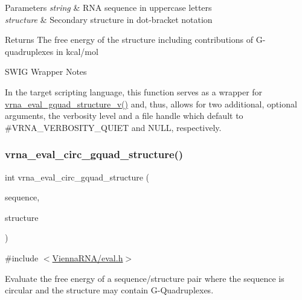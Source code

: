 \begin{DoxyParams}{Parameters}
{\em string} & R\+NA sequence in uppercase letters \\
\hline
{\em structure} & Secondary structure in dot-\/bracket notation \\
\hline
\end{DoxyParams}
\begin{DoxyReturn}{Returns}
The free energy of the structure including contributions of G-\/quadruplexes in kcal/mol
\end{DoxyReturn}
\begin{DoxyRefDesc}{S\+W\+I\+G Wrapper Notes}
\item[\hyperlink{wrappers__wrappers000037}{S\+W\+I\+G Wrapper Notes}]In the target scripting language, this function serves as a wrapper for \hyperlink{group__eval_gaeaa2bdbc1b5d78c667e735fbdff87fff}{vrna\+\_\+eval\+\_\+gquad\+\_\+structure\+\_\+v()} and, thus, allows for two additional, optional arguments, the verbosity level and a file handle which default to \#\+V\+R\+N\+A\+\_\+\+V\+E\+R\+B\+O\+S\+I\+T\+Y\+\_\+\+Q\+U\+I\+ET and N\+U\+LL, respectively. \end{DoxyRefDesc}
\mbox{\label{group__eval_ga9dba2fc5d7e6ad1359a7c2f350589c0e}} 
\subsubsection{\texorpdfstring{vrna\+\_\+eval\+\_\+circ\+\_\+gquad\+\_\+structure()}{vrna\_eval\_circ\_gquad\_structure()}}
{\footnotesize\ttfamily int vrna\+\_\+eval\+\_\+circ\+\_\+gquad\+\_\+structure (\begin{DoxyParamCaption}\item[{const char $\ast$}]{sequence,  }\item[{const char $\ast$}]{structure }\end{DoxyParamCaption})}



{\ttfamily \#include $<$\hyperlink{eval_8h}{Vienna\+R\+N\+A/eval.\+h}$>$}



Evaluate the free energy of a sequence/structure pair where the sequence is circular and the structure may contain G-\/\+Quadruplexes. 

